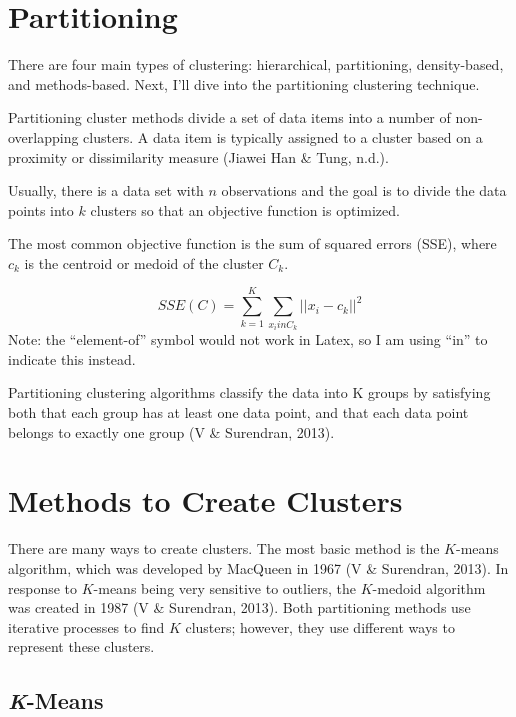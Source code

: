 \documentclass[12pt,twoside]{amherstthesis}
\begin{document}
  \section{Partitioning}\label{partitioning}
  
  There are four main types of clustering: hierarchical, partitioning,
  density-based, and methods-based. Next, I'll dive into the partitioning
  clustering technique.
  
  Partitioning cluster methods divide a set of data items into a number of
  non-overlapping clusters. A data item is typically assigned to a cluster
  based on a proximity or dissimilarity measure (Jiawei Han \& Tung,
  n.d.).
  
  Usually, there is a data set with \(n\) observations and the goal is to
  divide the data points into \(k\) clusters so that an objective function
  is optimized.
  
  The most common objective function is the sum of squared errors (SSE),
  where \(c_k\) is the centroid or medoid of the cluster \(C_k\).
  
  \[SSE(C)= \sum_{k=1}^K \sum_{x_{i} in C_{k}} ||{x_i}- c_k||^2\] Note:
  the ``element-of'' symbol would not work in Latex, so I am using ``in''
  to indicate this instead.
  
  Partitioning clustering algorithms classify the data into K groups by
  satisfying both that each group has at least one data point, and that
  each data point belongs to exactly one group (V \& Surendran, 2013).
  
  \section{Methods to Create Clusters}\label{methods-to-create-clusters}
  
  There are many ways to create clusters. The most basic method is the
  \(K\)-means algorithm, which was developed by MacQueen in 1967 (V \&
  Surendran, 2013). In response to \(K\)-means being very sensitive to
  outliers, the \(K\)-medoid algorithm was created in 1987 (V \&
  Surendran, 2013). Both partitioning methods use iterative processes to
  find \(K\) clusters; however, they use different ways to represent these
  clusters.
  
  \subsection{\texorpdfstring{\emph{K}-Means}{K-Means}}\label{k-means}
  
\end{document}

